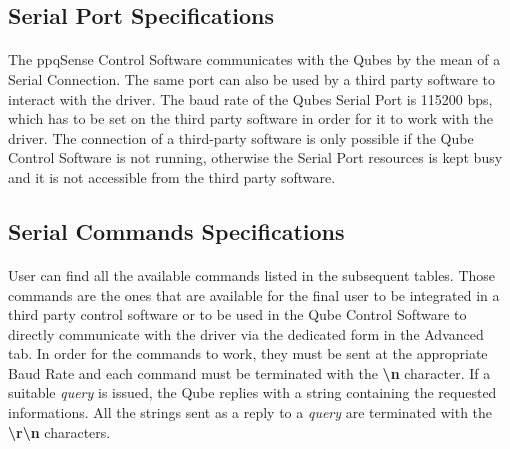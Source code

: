
\subsection{Serial Port Specifications}
\paragraph{} The ppqSense Control Software communicates with the Qubes by the mean of a Serial Connection. The same port can also be used by a third party software to interact with the driver. The baud rate of the Qubes Serial Port is 115200 bps, which has to be set on the third party software in order for it to work with the driver.
\newline The connection of a third-party software is only possible if the Qube Control Software is not running, otherwise the Serial Port resources is kept busy and it is not accessible from the third party software.





\subsection{Serial Commands Specifications}
\paragraph{} User can find all the available commands listed in the subsequent tables. Those commands are the ones that are available for the final user to be integrated in a third party control software or to be used in the Qube Control Software to directly communicate with the driver via the dedicated form in the Advanced tab.
\newline In order for the commands to work, they must be sent at the appropriate Baud Rate and each command must be terminated with the \textbf{\textbackslash n} character.
\newline If a suitable \textit{query} is issued, the Qube replies with a string containing the requested informations. All the strings sent as a reply to a \textit{query} are terminated with the \textbf{\textbackslash r\textbackslash n } characters.





